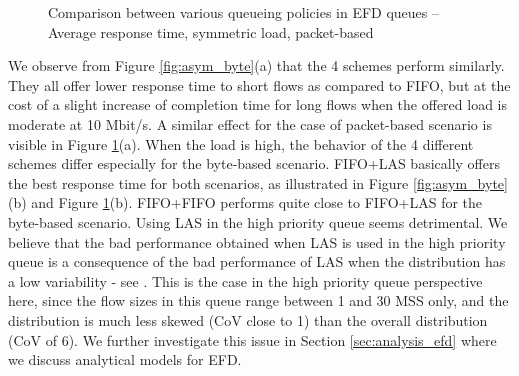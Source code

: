 \documentclass[preprint,12pt]{elsarticle}
\begin{document}
\begin{figure}[ht!]
  \centering
  \caption{Comparison between various queueing policies in EFD  queues -- Average response time, symmetric load, packet-based}
  \label{fig:asym_pkt}
\end{figure}

We observe from Figure \ref{fig:asym_byte}(a) that the 4 schemes perform similarly. They all offer lower response time to short flows as compared to FIFO, but at the cost of  a slight increase of completion time for long flows when the offered load is moderate at 10 Mbit/s. A similar effect for the case of packet-based scenario is visible in Figure \ref{fig:asym_pkt}(a). When the load is high, the behavior of the 4 different schemes differ especially for the byte-based scenario. FIFO+LAS basically offers the best response time for both scenarios, as illustrated in Figure \ref{fig:asym_byte}(b) and Figure \ref{fig:asym_pkt}(b). FIFO+FIFO performs quite close to FIFO+LAS for the byte-based scenario. Using LAS in the high priority queue seems  detrimental. We believe that the bad performance obtained when LAS is used in the high priority queue is a consequence of the bad performance of LAS when the distribution has a low variability - see \cite{kleinrock_76_queueing}. This is the case in the high  priority queue perspective here, since the flow sizes in this queue range  between 1 and 30 MSS only, and the distribution is much less skewed (CoV close to 1) than the overall distribution (CoV of 6).  We further investigate this issue in Section \ref{sec:analysis_efd} where we discuss analytical models for EFD.
\end{document}
